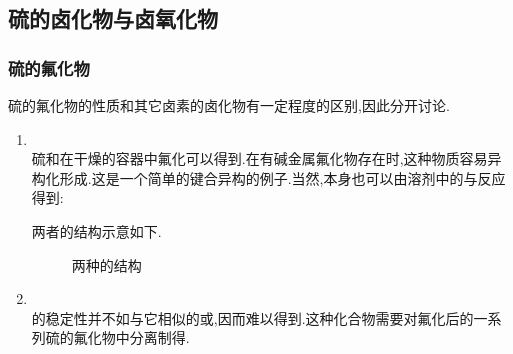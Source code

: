 \documentclass{ctexart}
\begin{document}
\subsection{硫的卤化物与卤氧化物}
\subsubsection{硫的氟化物} 硫的氟化物的性质和其它卤素的卤化物有一定程度的区别,因此分开讨论.
\begin{enumerate}[label=\tbf{\arabic*},topsep=0pt,parsep=0pt,itemsep=0pt,partopsep=0pt]
    \item {}\\
        硫和在干燥的容器中氟化可以得到.在有碱金属氟化物存在时,这种物质容易异构化形成.这是一个简单的键合异构的例子.当然,本身也可以由溶剂中的与反应得到:
        \begin{center}
        \end{center}
        两者的结构示意如下.
        \begin{figure}[H]
            \centering
            \caption{两种的结构}
        \end{figure}
    \item {}\\
        \indent {}的稳定性并不如与它相似的或,因而难以得到.这种化合物需要对氟化后的一系列硫的氟化物中分离制得.

\end{enumerate}
\end{document}
